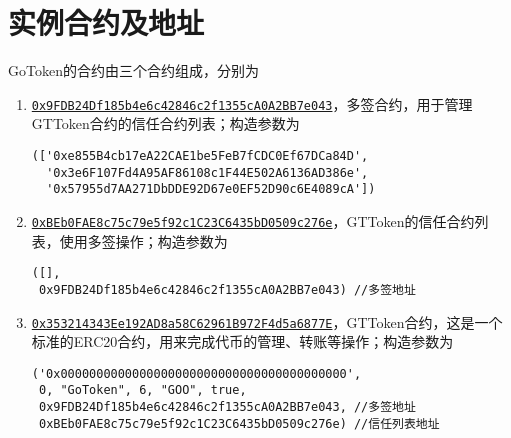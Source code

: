 \documentclass[12pt]{article}
\newcommand{\ethaddr}[1]{{\href{https://etherscan.io/address/#1}{\texttt{#1}}}}
\begin{document}
\section{实例合约及地址}

GoToken的合约由三个合约组成，分别为
\begin{enumerate}
\item \ethaddr{0x9FDB24Df185b4e6c42846c2f1355cA0A2BB7e043}，多签合约，用于管理GTToken合约的信任合约列表；构造参数为
\begin{verbatim}
(['0xe855B4cb17eA22CAE1be5FeB7fCDC0Ef67DCa84D',
  '0x3e6F107Fd4A95AF86108c1F44E502A6136AD386e',
  '0x57955d7AA271DbDDE92D67e0EF52D90c6E4089cA'])
\end{verbatim}
\item \ethaddr{0xBEb0FAE8c75c79e5f92c1C23C6435bD0509c276e}，GTToken的信任合约列表，使用多签操作；构造参数为
\begin{verbatim}
([], 
 0x9FDB24Df185b4e6c42846c2f1355cA0A2BB7e043) //多签地址
\end{verbatim}
\item \ethaddr{0x353214343Ee192AD8a58C62961B972F4d5a6877E}，GTToken合约，这是一个标准的ERC20合约，用来完成代币的管理、转账等操作；构造参数为
\begin{verbatim}
('0x0000000000000000000000000000000000000000', 
 0, "GoToken", 6, "GOO", true, 
 0x9FDB24Df185b4e6c42846c2f1355cA0A2BB7e043, //多签地址
 0xBEb0FAE8c75c79e5f92c1C23C6435bD0509c276e) //信任列表地址
\end{verbatim}
\end{enumerate}
\end{document}

